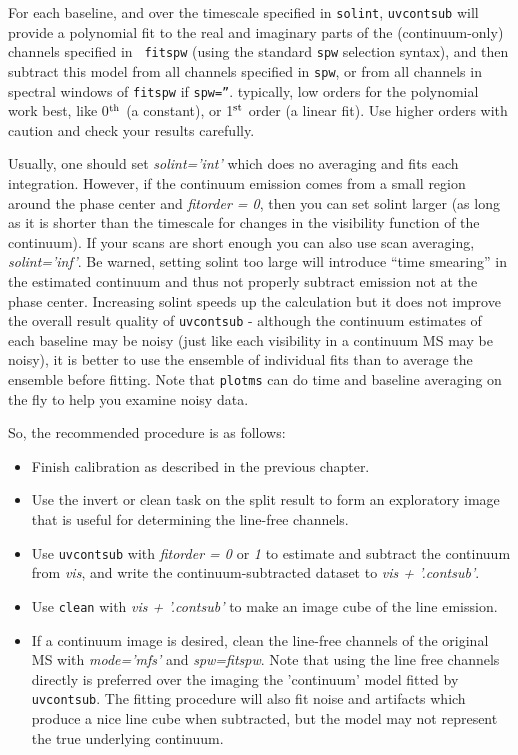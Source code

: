 For each baseline, and over the timescale specified in {\tt solint},
{\tt uvcontsub} will provide a polynomial fit to the real and
imaginary parts of the (continuum-only) channels specified in {\tt
fitspw} (using the standard {\tt spw} selection syntax), 
and then subtract this model from all channels specified in {\tt spw}, or
from all channels in spectral windows of {\tt fitspw} if {\tt spw=''}.
typically, low orders for the polynomial work best, like 0$^{\rm th}$ (a
constant), or 1$^{\rm st}$ order (a linear fit). Use higher orders with caution
and check your results carefully.

Usually, one should set {\it solint='int'} which does no averaging and fits
each integration. However, if the continuum emission comes from a small
region around the phase center and {\it fitorder = 0}, then you can set solint
larger (as long as it is shorter than the timescale for changes in the
visibility function of the continuum).  If your scans are short enough you
can also use scan averaging, {\it solint='inf'}. Be warned, setting solint too
large will introduce ``time smearing'' in the estimated continuum and thus
not properly subtract emission not at the phase center.  Increasing solint
speeds up the calculation but it does not improve the overall result
quality of {\tt uvcontsub} - although the continuum estimates of each baseline
may be noisy (just like each visibility in a continuum MS may be noisy),
it is better to use the ensemble of individual fits than to average the
ensemble before fitting.  Note that {\tt plotms} can do time and baseline
averaging on the fly to help you examine noisy data.


So, the recommended procedure is as follows:
\begin{itemize}
\item Finish calibration as described in the previous chapter.
\item Use the invert or clean task on the split result to form an exploratory
  image that is useful for determining the line-free channels.
\item Use {\tt uvcontsub} with {\it fitorder = 0} or {\it 1} to estimate and subtract the
  continuum from {\it vis}, and write the continuum-subtracted dataset
  to {\it vis + '.contsub'}.
\item Use {\tt clean} with {\it vis + '.contsub'} to make an image cube of the line emission.
\item If a continuum image is desired, clean the line-free channels of the
  original MS with {\it mode='mfs'} and {\it spw=fitspw}. Note that
  using the line free channels directly is preferred over the imaging
  the 'continuum' model fitted by {\tt uvcontsub}. The fitting
  procedure will also fit noise and artifacts which produce a nice
  line cube when subtracted, but the model may not represent the true
  underlying continuum.   
\end{itemize}

